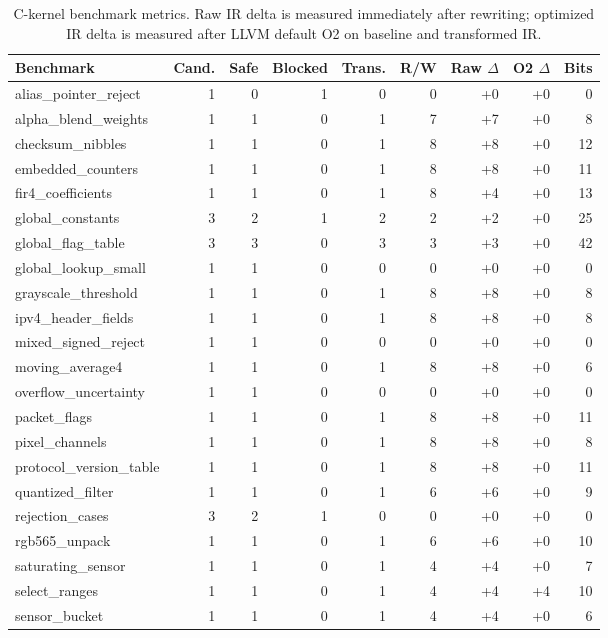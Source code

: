 \begin{table}[t]
\centering
\caption{C-kernel benchmark metrics. Raw IR delta is measured immediately after rewriting; optimized IR delta is measured after LLVM default O2 on baseline and transformed IR.}
\label{tab:benchmark-results}
\begin{tabular}{lrrrrrrrr}
\hline
Benchmark & Cand. & Safe & Blocked & Trans. & R/W & Raw $\Delta$ & O2 $\Delta$ & Bits \\
\hline
alias\_pointer\_reject & 1 & 0 & 1 & 0 & 0 & +0 & +0 & 0 \\
alpha\_blend\_weights & 1 & 1 & 0 & 1 & 7 & +7 & +0 & 8 \\
checksum\_nibbles & 1 & 1 & 0 & 1 & 8 & +8 & +0 & 12 \\
embedded\_counters & 1 & 1 & 0 & 1 & 8 & +8 & +0 & 11 \\
fir4\_coefficients & 1 & 1 & 0 & 1 & 8 & +4 & +0 & 13 \\
global\_constants & 3 & 2 & 1 & 2 & 2 & +2 & +0 & 25 \\
global\_flag\_table & 3 & 3 & 0 & 3 & 3 & +3 & +0 & 42 \\
global\_lookup\_small & 1 & 1 & 0 & 0 & 0 & +0 & +0 & 0 \\
grayscale\_threshold & 1 & 1 & 0 & 1 & 8 & +8 & +0 & 8 \\
ipv4\_header\_fields & 1 & 1 & 0 & 1 & 8 & +8 & +0 & 8 \\
mixed\_signed\_reject & 1 & 1 & 0 & 0 & 0 & +0 & +0 & 0 \\
moving\_average4 & 1 & 1 & 0 & 1 & 8 & +8 & +0 & 6 \\
overflow\_uncertainty & 1 & 1 & 0 & 0 & 0 & +0 & +0 & 0 \\
packet\_flags & 1 & 1 & 0 & 1 & 8 & +8 & +0 & 11 \\
pixel\_channels & 1 & 1 & 0 & 1 & 8 & +8 & +0 & 8 \\
protocol\_version\_table & 1 & 1 & 0 & 1 & 8 & +8 & +0 & 11 \\
quantized\_filter & 1 & 1 & 0 & 1 & 6 & +6 & +0 & 9 \\
rejection\_cases & 3 & 2 & 1 & 0 & 0 & +0 & +0 & 0 \\
rgb565\_unpack & 1 & 1 & 0 & 1 & 6 & +6 & +0 & 10 \\
saturating\_sensor & 1 & 1 & 0 & 1 & 4 & +4 & +0 & 7 \\
select\_ranges & 1 & 1 & 0 & 1 & 4 & +4 & +4 & 10 \\
sensor\_bucket & 1 & 1 & 0 & 1 & 4 & +4 & +0 & 6 \\

\end{tabular}
\end{table}
